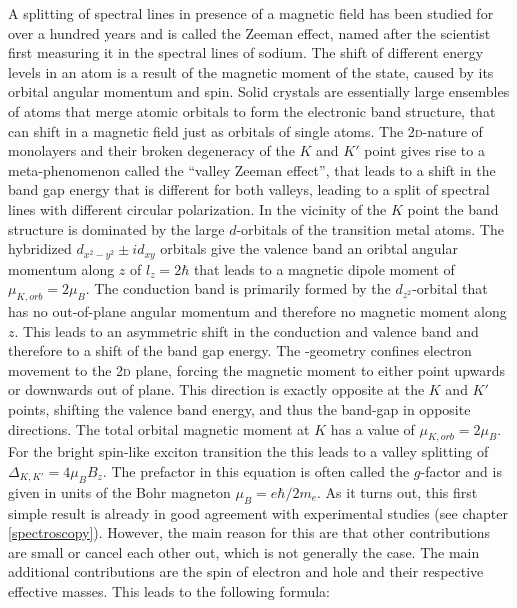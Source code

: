 A splitting of spectral lines in presence of a magnetic field has been studied for over a hundred years and is called the Zeeman effect, named after the scientist first measuring it in the spectral lines of sodium. The shift of different energy levels in an atom is a result of the magnetic moment of the state, caused by its orbital angular momentum and spin. Solid crystals are essentially large ensembles of atoms that merge atomic orbitals to form the electronic band structure, that can shift in a magnetic field just as orbitals of single atoms. The 2\textsc{d}-nature of \tmdg monolayers and their broken degeneracy of the $K$ and $K'$ point gives rise to a meta-phenomenon called the ``valley Zeeman effect'', that leads to a shift in the band gap energy that is different for both valleys, leading to a split of spectral lines with different circular polarization\cite{srivastava_valley_2015, aivazian_magnetic_2015}. In the vicinity of the $K$ point the band structure is dominated by the large $d$-orbitals of the transition metal atoms. The hybridized $d_{x^2-y^2} \pm id_{xy}$ orbitals give the valence band an oribtal angular momentum along $z$ of $l_z=2\hbar$ that leads to a magnetic dipole moment of $\mu_{K,orb}=2\mu_B$. The conduction band is primarily formed by the $d_{z^2}$-orbital that has no out-of-plane angular momentum and therefore no magnetic moment along $z$. This leads to an asymmetric shift in the conduction and valence band and therefore to a shift of the band gap energy. The \tmd-geometry confines electron movement to the 2\textsc{d} plane, forcing the magnetic moment to either point upwards or downwards out of plane. This direction is exactly opposite at the $K$ and $K'$ points, shifting the valence band energy, and thus the band-gap in opposite directions. The total orbital magnetic moment at $K$ has a value of $\mu_{K,orb}=2\mu_B$. For the bright spin-like exciton transition the this leads to a valley splitting of $\Delta_{K,K'}=4\mu_BB_z$. The prefactor in this equation is often called the $g$-factor and is given in units of the Bohr magneton $\mu_B=e\hbar/2m_e$. As it turns out, this first simple result is already in good agreement with experimental studies (see chapter \ref{spectroscopy}). However, the main reason for this are that other contributions are small or cancel each other out, which is not generally the case. The main additional contributions are the spin of electron and hole and their respective effective masses. %
This leads to the following formula:

